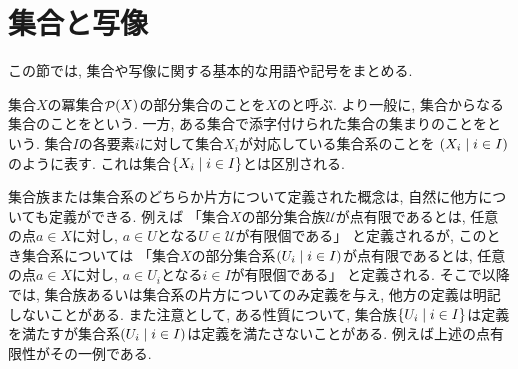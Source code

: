 \documentclass[uplatex, dvipdfmx, a4paper, 12pt, class=jsbook, crop=false]{standalone}
\begin{document}
\section{集合と写像}
\label{sec:sets-and-maps}

この節では, 集合や写像に関する基本的な用語や記号をまとめる.

集合$X$の冪集合$\mathop{\mathcal{P}}\nolimits(X)$の部分集合のことを$X$のと呼ぶ.
より一般に, 集合からなる集合のことをという.
一方, ある集合で添字付けられた集合の集まりのことをという.
集合$I$の各要素$i$に対して集合$X_i$が対応している集合系のことを
\(\setfamily{X_i}{i \in I}\)
のように表す.
これは集合$\setcomp{X_i}{i \in I}$とは区別される.

集合族または集合系のどちらか片方について定義された概念は,
自然に他方についても定義ができる.
例えば
「集合$X$の部分集合族$\mathscr{U}$が点有限であるとは, 任意の点$a \in X$に対し, $a \in U$となる$U \in \mathscr{U}$が有限個である」
と定義されるが, このとき集合系については
「集合$X$の部分集合系$\setfamily{U_i}{i \in I}$が点有限であるとは, 任意の点$a \in X$に対し, $a \in U_i$となる$i \in I$が有限個である」
と定義される.
そこで以降では, 集合族あるいは集合系の片方についてのみ定義を与え, 他方の定義は明記しないことがある.
また注意として, ある性質について, 集合族$\setcomp{U_i}{i \in I}$は定義を満たすが集合系$\setfamily{U_i}{i \in I}$は定義を満たさないことがある.
例えば上述の点有限性がその一例である.
\end{document}

